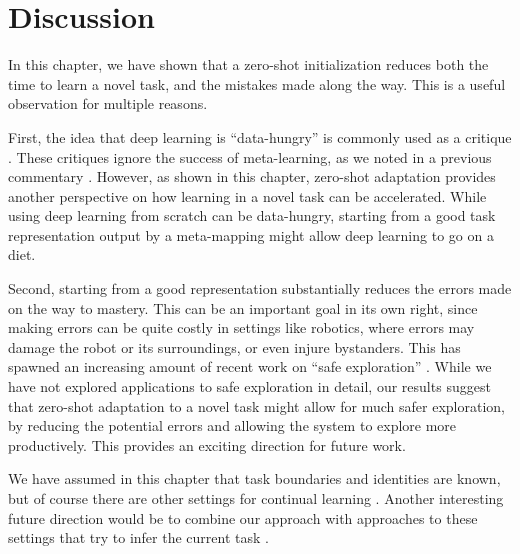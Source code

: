 \section{Discussion}
In this chapter, we have shown that a zero-shot initialization reduces both the time to learn a novel task, and the mistakes made along the way. This is a useful observation for multiple reasons. \par 
First, the idea that deep learning is ``data-hungry'' is commonly used as a critique \citep[e.g.]{Lake2016, Marcus2018}. These critiques ignore the success of meta-learning, as we noted in a previous commentary \citep{Hansen2017}. However, as shown in this chapter, zero-shot adaptation provides another perspective on how learning in a novel task can be accelerated. While using deep learning from scratch can be data-hungry, starting from a good task representation output by a meta-mapping might allow deep learning to go on a diet. \par  
Second, starting from a good representation substantially reduces the errors made on the way to mastery. This can be an important goal in its own right, since making errors can be quite costly in settings like robotics, where errors may damage the robot or its surroundings, or even injure bystanders. This has spawned an increasing amount of recent work on ``safe exploration'' \citep[e.g.][]{Turchetta2016, Turchetta2019}. While we have not explored applications to safe exploration in detail, our results suggest that zero-shot adaptation to a novel task might allow for much safer exploration, by reducing the potential errors and allowing the system to explore more productively. This provides an exciting direction for future work. \par  
We have assumed in this chapter that task boundaries and identities are known, but of course there are other settings for continual learning \citep{Ven2018}. Another interesting future direction would be to combine our approach with approaches to these settings that try to infer the current task \citep[e.g][]{Nagabandi2019}. \par

